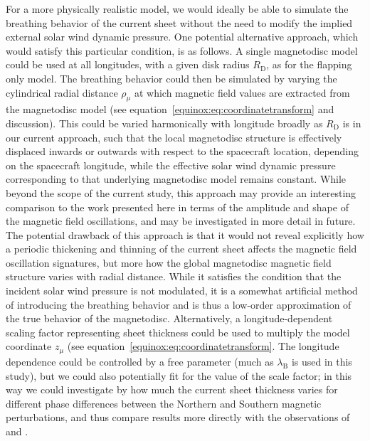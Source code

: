 For a more physically realistic model, we would ideally be able to simulate the breathing behavior of the current sheet without the need to modify the implied external solar wind dynamic pressure. One potential alternative approach, which would satisfy this particular condition, is as follows. A single magnetodisc model could be used at all longitudes, with a given disk radius $R_\mathrm{D}$, as for the flapping only model. The breathing behavior could then be simulated by varying the cylindrical radial distance $\rho_\mu$ at which magnetic field values are extracted from the magnetodisc model (see equation~\ref{equinox:eq:coordinatetransform} and discussion). This could be varied harmonically with longitude broadly as $R_\mathrm{D}$ is in our current approach, such that the local magnetodisc structure is effectively displaced inwards or outwards with respect to the spacecraft location, depending on the spacecraft longitude, while the effective solar wind dynamic pressure corresponding to that underlying magnetodisc model remains constant. While beyond the scope of the current study, this approach may provide an interesting comparison to the work presented here in terms of the amplitude and shape of the magnetic field oscillations, and may be investigated in more detail in future. The potential drawback of this approach is that it would not reveal explicitly how a periodic thickening and thinning of the current sheet affects the magnetic field oscillation signatures, but more how the global magnetodisc magnetic field structure varies with radial distance. While it satisfies the condition that the incident solar wind pressure is not modulated, it is a somewhat artificial method of introducing the breathing behavior and is thus a low-order approximation of the true behavior of the magnetodisc. Alternatively, a longitude-dependent scaling factor representing sheet thickness could be used to multiply the model coordinate $z_\mu$ (see equation~\ref{equinox:eq:coordinatetransform}. The longitude dependence could be controlled by a free parameter (much as $\lambda_\mathrm{B}$ is used in this study), but we could also potentially fit for the value of the scale factor; in this way we could investigate by how much the current sheet thickness varies for different phase differences between the Northern and Southern magnetic perturbations, and thus compare results more directly with the observations of \citep{provan2012} and \citep{cowley2017b}.
